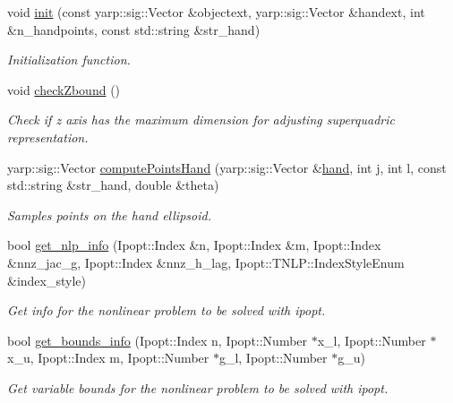 \begin{DoxyCompactItemize}
\item 
void \hyperlink{classgrasping__NLP_abcf09fd329994523df9cebab0c607006}{init} (const yarp\+::sig\+::\+Vector \&objectext, yarp\+::sig\+::\+Vector \&handext, int \&n\+\_\+handpoints, const std\+::string \&str\+\_\+hand)
\begin{DoxyCompactList}\small\item\em Initialization function. \end{DoxyCompactList}\item 
void \hyperlink{classgrasping__NLP_ae0324a359506cd9d334b16cf8c4136ed}{check\+Zbound} ()\label{classgrasping__NLP_ae0324a359506cd9d334b16cf8c4136ed}

\begin{DoxyCompactList}\small\item\em Check if z axis has the maximum dimension for adjusting superquadric representation. \end{DoxyCompactList}\item 
yarp\+::sig\+::\+Vector \hyperlink{classgrasping__NLP_afbe118dd339bb975cd5e340fa0801cec}{compute\+Points\+Hand} (yarp\+::sig\+::\+Vector \&\hyperlink{classgrasping__NLP_abdf5321a362b6b73b54271d81e8cdd17}{hand}, int j, int l, const std\+::string \&str\+\_\+hand, double \&theta)
\begin{DoxyCompactList}\small\item\em Samples points on the hand ellipsoid. \end{DoxyCompactList}\item 
bool \hyperlink{classgrasping__NLP_a49d0b788d4d17f32efca951ed6556ca0}{get\+\_\+nlp\+\_\+info} (Ipopt\+::\+Index \&n, Ipopt\+::\+Index \&m, Ipopt\+::\+Index \&nnz\+\_\+jac\+\_\+g, Ipopt\+::\+Index \&nnz\+\_\+h\+\_\+lag, Ipopt\+::\+T\+N\+L\+P\+::\+Index\+Style\+Enum \&index\+\_\+style)
\begin{DoxyCompactList}\small\item\em Get info for the nonlinear problem to be solved with ipopt. \end{DoxyCompactList}\item 
bool \hyperlink{classgrasping__NLP_a1be828e10f1182f3befccbafdb90b577}{get\+\_\+bounds\+\_\+info} (Ipopt\+::\+Index n, Ipopt\+::\+Number $\ast$x\+\_\+l, Ipopt\+::\+Number $\ast$x\+\_\+u, Ipopt\+::\+Index m, Ipopt\+::\+Number $\ast$g\+\_\+l, Ipopt\+::\+Number $\ast$g\+\_\+u)
\begin{DoxyCompactList}\small\item\em Get variable bounds for the nonlinear problem to be solved with ipopt. \end{DoxyCompactList}\item 

\end{DoxyCompactItemize}
